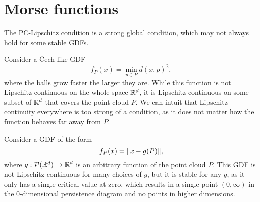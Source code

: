 \section{Morse functions}
The PC-Lipschitz condition is a strong global condition, which may not always
hold for some stable GDFs.
\begin{example}
    Consider a \v{C}ech-like GDF
    \begin{equation}
        f_P(x) = \min_{p \in P} d(x, p)^2,
    \end{equation}
    where the balls grow faster the larger they are. While this function is not
    Lipschitz continuous on the whole space $\mathbb{R}^d$, it is Lipschitz continuous
    on some subset of $\mathbb{R}^d$ that covers the point cloud $P$. We can intuit that
    Lipschitz continuity everywhere is too strong of a condition, as it does not
    matter how the function behaves far away from $P$.
\end{example}
\begin{example}
    Consider a GDF of the form
    \begin{equation}
        f_P(x) = \norm{x - g(P)},
    \end{equation}
    where $g : \mathcal{P}(\mathbb{R}^d) \to \mathbb{R}^d$ is an arbitrary function of the point
    cloud $P$. This GDF is not Lipschitz continuous for many choices of $g$,
    but it is stable for any $g$, as it only has a single critical value at zero,
    which results in a single point $(0, \infty)$ in the 0-dimensional persistence
    diagram and no points in higher dimensions.
\end{example}

